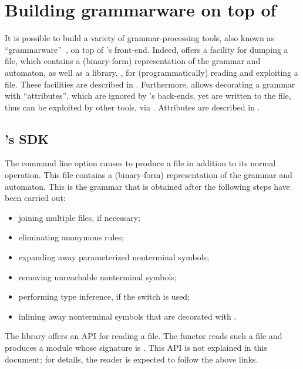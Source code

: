 \documentclass[onecolumn,11pt,nocopyrightspace,preprint]{sigplanconf}
\begin{document}
\section{Building grammarware on top of \menhir}
\label{sec:grammarware}

It is possible to build a variety of grammar-processing tools,
also known as ``grammarware''~\cite{klint-laemmel-verhoef-05},
on top of \menhir's front-end. Indeed, \menhir offers a facility
for dumping a \cmly file, which contains a (binary-form) representation
of the grammar and automaton,
as well as a library, \menhirsdk,
for (programmatically) reading and exploiting a \cmly file.
These facilities are described in .
%
Furthermore, \menhir allows decorating a grammar with ``attributes'',
which are ignored by \menhir's back-ends,
yet are written to the \cmly file,
thus can be exploited by other tools, via \menhirsdk.
%
Attributes are described in .

\subsection{\menhir's SDK}
\label{sec:sdk}

The command line option \ocmly causes \menhir to produce a \cmly file in
addition to its normal operation. This file contains a (binary-form)
representation of the grammar and automaton. This is the grammar that
is obtained after the following steps have been carried out:
\begin{itemize}
\item joining multiple \mly files, if necessary; %
\item eliminating anonymous rules;
\item expanding away parameterized nonterminal symbols;
\item removing unreachable nonterminal symbols;
\item performing \ocaml type inference, if the \oinfer switch is used;
\item inlining away nonterminal symbols that are decorated with \dinline.
\end{itemize}

The library \menhirsdk offers an API for reading a \cmly file.
The functor 
reads such a file and produces a module whose signature is
.
This API is not explained in this document; for details,
the reader is expected to follow the above links.
\end{document}
